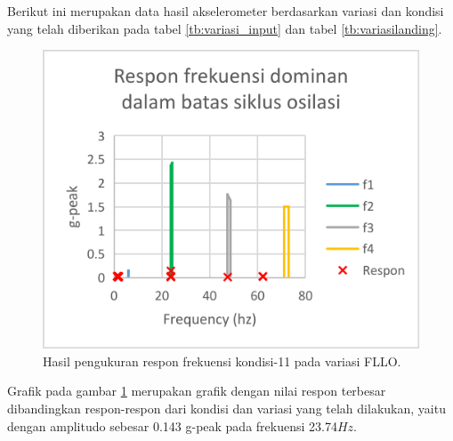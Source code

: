 Berikut ini merupakan data hasil akselerometer berdasarkan variasi dan kondisi yang telah diberikan pada tabel \ref{tb:variasi_input} dan tabel \ref{tb:variasilanding}.

\begin{figure}[H]
	\centering
	\includegraphics[width=0.6\linewidth]{gambar/hasil_akselero/Condition_11/FLLO.png}
	\caption{Hasil pengukuran respon frekuensi kondisi-11 pada variasi FLLO.}
	\label{fig:11_FLLO}
\end{figure}

Grafik pada gambar \ref{fig:11_FLLO} merupakan grafik dengan nilai respon terbesar dibandingkan respon-respon dari kondisi dan variasi yang telah dilakukan, yaitu dengan amplitudo sebesar 0.143 g-peak pada frekuensi 23.74$Hz$. 

